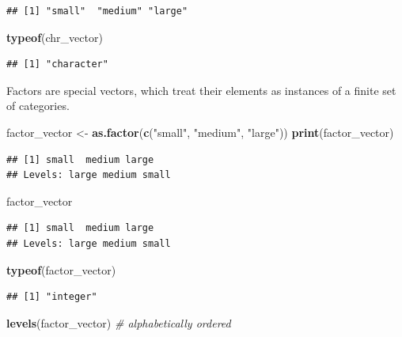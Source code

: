 \documentclass[
]{book}
\newenvironment{Shaded}{\begin{snugshade}}{\end{snugshade}}
\newcommand{\CommentTok}[1]{\textcolor[rgb]{0.56,0.35,0.01}{\textit{#1}}}
\newcommand{\FunctionTok}[1]{\textcolor[rgb]{0.13,0.29,0.53}{\textbf{#1}}}
\newcommand{\NormalTok}[1]{#1}
\newcommand{\OtherTok}[1]{\textcolor[rgb]{0.56,0.35,0.01}{#1}}
\newcommand{\StringTok}[1]{\textcolor[rgb]{0.31,0.60,0.02}{#1}}
\begin{document}
\begin{verbatim}
## [1] "small"  "medium" "large"
\end{verbatim}

\begin{Shaded}
\begin{Highlighting}[]
\FunctionTok{typeof}\NormalTok{(chr\_vector)}
\end{Highlighting}
\end{Shaded}

\begin{verbatim}
## [1] "character"
\end{verbatim}

Factors are special vectors, which treat their elements as instances of a finite set of categories.

\begin{Shaded}
\begin{Highlighting}[]
\NormalTok{factor\_vector }\OtherTok{\textless{}{-}} \FunctionTok{as.factor}\NormalTok{(}\FunctionTok{c}\NormalTok{(}\StringTok{"small"}\NormalTok{, }\StringTok{"medium"}\NormalTok{, }\StringTok{"large"}\NormalTok{))}
\FunctionTok{print}\NormalTok{(factor\_vector)}
\end{Highlighting}
\end{Shaded}

\begin{verbatim}
## [1] small  medium large 
## Levels: large medium small
\end{verbatim}

\begin{Shaded}
\begin{Highlighting}[]
\NormalTok{factor\_vector}
\end{Highlighting}
\end{Shaded}

\begin{verbatim}
## [1] small  medium large 
## Levels: large medium small
\end{verbatim}

\begin{Shaded}
\begin{Highlighting}[]
\FunctionTok{typeof}\NormalTok{(factor\_vector)}
\end{Highlighting}
\end{Shaded}

\begin{verbatim}
## [1] "integer"
\end{verbatim}

\begin{Shaded}
\begin{Highlighting}[]
\FunctionTok{levels}\NormalTok{(factor\_vector) }\CommentTok{\# alphabetically ordered}
\end{Highlighting}
\end{Shaded}
\end{document}
